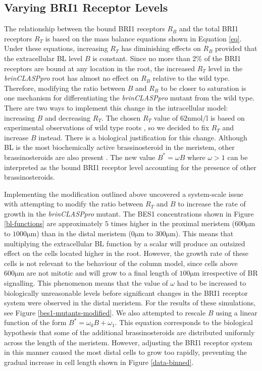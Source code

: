 \documentclass[referee,pdflatex,sn-mathphys-num]{sn-jnl}
\newcommand{\um}{\unit{\micro\metre}}
\newcommand{\nm}{\unit{\nano\mole\per\litre}}
\begin{document}
\subsection{Varying BRI1 Receptor Levels}

The relationship between the bound BRI1 receptors $R_{B}$ and the total BRI1 receptors $R_{T}$ is based on the mass balance equations shown in Equation \eqref{eq}.
Under these equations, increasing $R_{T}$ has diminishing effects on $R_{B}$ provided that the extracellular BL level $B$ is constant.
Since no more than $2\%$ of the BRI1 receptors are bound at any location in the root, the increased $R_{T}$ level in the \emph{brinCLASPpro} root has almost no effect on $R_{B}$ relative to the wild type.
Therefore, modifying the ratio between $B$ and $R_{B}$ to be closer to saturation is one mechanism for differentiating the \emph{brinCLASPpro} mutant from the wild type.
There are two ways to implement this change in the intracellular model: increasing $B$ and decreasing $R_{T}$.
The chosen $R_{T}$ value of $62\nm$ is based on experimental observations of wild type roots \cite{vanesse2011}, so we decided to fix $R_{T}$ and increase $B$ instead.
There is a biological justification for this change.
Although BL is the most biochemically active brassinosteroid in the meristem, other brassinosteroids are also present \cite{vukasinovic2021, ackerman-lavert2020}.
The new value $B^{*} = \omega B$ where $\omega > 1$ can be interpreted as the bound BRI1 receptor level accounting for the presence of other brassinosteroids. 

Implementing the modification outlined above uncovered a system-scale issue with attempting to modify the ratio between $R_{T}$ and $B$ to increase the rate of growth in the \emph{brinCLASPpro} mutant.
The BES1 concentrations shown in Figure \ref{bl-functions} are approximately $5$ times higher in the proximal meristem ($600\um$ to $1000\um$) than in the distal meristem ($0\um$ to $300\um$).
This means that multiplying the extracellular BL function by a scalar will produce an outsized effect on the cells located higher in the root.
However, the growth rate of these cells is not relevant to the behaviour of the column model, since cells above $600\um$ are not mitotic and will grow to a final length of $100\um$ irrespective of BR signalling.
This phenomenon means that the value of $\omega$ had to be increased to biologically unreasonable levels before significant changes in the BRI1 receptor system were observed in the distal meristem.
For the results of these simulations, see Figure \ref{bes1-mutants-modified}.
We also attempted to rescale $B$ using a linear function of the form $B^{*} = \omega_{0}B + \omega_{1}$.
This equation corresponds to the biological hypothesis that some of the additional brassinosteroids are distributed uniformly across the length of the meristem.
However, adjusting the BRI1 receptor system in this manner caused the most distal cells to grow too rapidly, preventing the gradual increase in cell length shown in Figure \ref{data-binned}.
 
\end{document}
